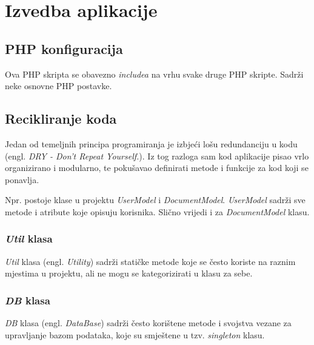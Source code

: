 \section{Izvedba aplikacije}

  \subsection{PHP konfiguracija}

    Ova PHP skripta se obavezno \textit{includea} na vrhu svake druge PHP
    skripte. Sadrži neke osnovne PHP postavke.

    

  \subsection{Recikliranje koda}

    Jedan od temeljnih principa programiranja je izbjeći lošu redundanciju u
    kodu (engl. \textit{DRY - Don't Repeat Yourself.}). Iz tog razloga sam kod
    aplikacije pisao vrlo organizirano i modularno, te pokušavao definirati
    metode i funkcije za kod koji se ponavlja.

    Npr. postoje klase u projektu \textit{UserModel} i \textit{DocumentModel}.
    \textit{UserModel} sadrži sve metode i atribute koje opisuju korisnika.
    Slično vrijedi i za \textit{DocumentModel} klasu.

    \subsubsection{\textit{Util} klasa}

      \textit{Util} klasa (engl. \textit{Utility}) sadrži statičke metode koje
      se često koriste na raznim mjestima u projektu, ali ne mogu se
      kategorizirati u klasu za sebe.

      

    \subsubsection{\textit{DB} klasa}

      \textit{DB} klasa (engl. \textit{DataBase}) sadrži često korištene metode
      i svojstva vezane za upravljanje bazom podataka, koje su smještene u tzv.
      \textit{singleton} klasu.

